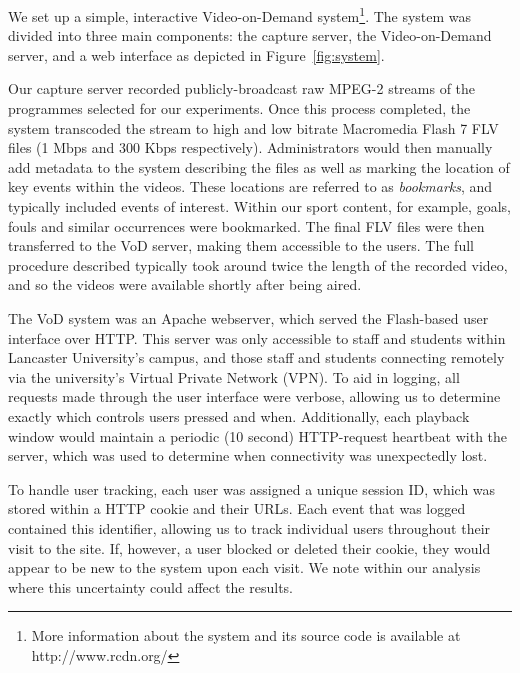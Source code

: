 \documentclass[a4paper,11pt]{article}
\begin{document}
We set up a simple, interactive Video-on-Demand system\footnote{More information about the system and its source code is available at http://www.rcdn.org/}. The system was divided into three main components: the capture server, the Video-on-Demand server, and a web interface as depicted in Figure~\ref{fig:system}.


Our capture server recorded publicly-broadcast raw MPEG-2 streams of the programmes selected for our experiments. Once this process completed, the system transcoded the stream to high and low bitrate Macromedia Flash 7 FLV files (1 Mbps and 300 Kbps respectively). Administrators would then manually add metadata to the system describing the files as well as marking the location of key events within the videos. These locations are referred to as \emph{bookmarks}, and typically included events of interest. Within our sport content, for example, goals, fouls and similar occurrences were bookmarked. The final FLV files were then transferred to the VoD server, making them accessible to the users. The full procedure described typically took around twice the length of the recorded video, and so the videos were available shortly after being aired.

The VoD system was an Apache webserver, which served the Flash-based user interface over HTTP. This server was only accessible to staff and students within Lancaster University's campus, and those staff and students connecting remotely via the university's Virtual Private Network (VPN). To aid in logging, all requests made through the user interface were verbose, allowing us to determine exactly which controls users pressed and when. Additionally, each playback window would maintain a periodic (10 second) HTTP-request heartbeat with the server, which was used to determine when connectivity was unexpectedly lost.

To handle user tracking, each user was assigned a unique session ID, which was stored within a HTTP cookie and their URLs. Each event that was logged contained this identifier, allowing us to track individual users throughout their visit to the site. If, however, a user blocked or deleted their cookie, they would appear to be new to the system upon each visit. We note within our analysis where this uncertainty could affect the results.
\end{document}
